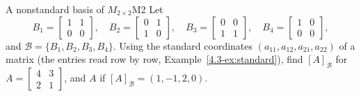 \documentclass[11pt]{article}
\begin{document}
\begin{exmp}{A nonstandard basis of $M_{2\times2}$}{M2}
Let
\[
B_1=\begin{bmatrix}1&1\\0&0\end{bmatrix},\quad B_2=\begin{bmatrix}0&1\\1&0\end{bmatrix},\quad B_3=\begin{bmatrix}0&0\\1&1\end{bmatrix},\quad B_4=\begin{bmatrix}1&0\\0&0\end{bmatrix},
\]
and $\mathcal{B}=\{B_1,B_2,B_3,B_4\}$. Using the standard coordinates $(a_{11},a_{12},a_{21},a_{22})$ of a matrix (the entries read row by row, Example~\ref{4.3-ex:standard}), find $[A]_{\mathcal{B}}$ for $A=\begin{bmatrix}4&3\\2&1\end{bmatrix}$, and $A$ if $[A]_{\mathcal{B}}=(1,-1,2,0)$.


\end{exmp}
\end{document}
